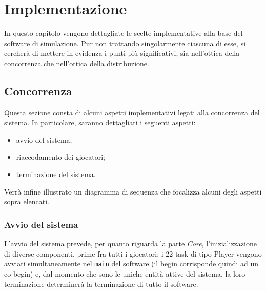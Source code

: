 
\section{Implementazione}
\label{sec:implementazione}

In questo capitolo vengono dettagliate le scelte implementative alla base del software di simulazione. Pur non trattando singolarmente ciascuna di esse, si cercherà di mettere in evidenza i punti più significativi, sia nell'ottica della concorrenza che nell'ottica della distribuzione.

\subsection{Concorrenza}
\label{sec:implemetazione_concorrenza}

Questa sezione consta di alcuni aspetti implementativi legati alla concorrenza del sistema. In particolare, saranno dettagliati i seguenti aspetti:

\begin{itemize}
	\item avvio del sistema;
	\item riaccodamento dei giocatori;
	\item terminazione del sistema.
\end{itemize}

Verrà infine illustrato un diagramma di sequenza che focalizza alcuni degli aspetti sopra elencati.\\

\subsubsection{Avvio del sistema}
\label{sec:implementazione_concorrenza_avvio_sistema}

L'avvio del sistema prevede, per quanto riguarda la parte \emph{Core}, l'inizializzazione di diverse componenti, prime fra tutti i giocatori: i 22 task di tipo Player vengono avviati simultaneamente nel \verb+main+ del software (il begin corrisponde quindi ad un co-begin) e, dal momento che sono le uniche entità attive del sistema, la loro terminazione determinerà la terminazione di tutto il software.\\

